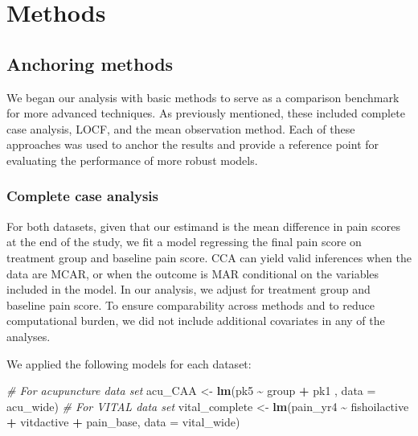 \documentclass{article}
\newenvironment{Shaded}{\begin{snugshade}}{\end{snugshade}}
\newcommand{\AttributeTok}[1]{\textcolor[rgb]{0.13,0.29,0.53}{#1}}
\newcommand{\CommentTok}[1]{\textcolor[rgb]{0.56,0.35,0.01}{\textit{#1}}}
\newcommand{\FunctionTok}[1]{\textcolor[rgb]{0.13,0.29,0.53}{\textbf{#1}}}
\newcommand{\NormalTok}[1]{#1}
\newcommand{\OtherTok}[1]{\textcolor[rgb]{0.56,0.35,0.01}{#1}}
\newcommand{\SpecialCharTok}[1]{\textcolor[rgb]{0.81,0.36,0.00}{\textbf{#1}}}
\begin{document}
\newpage

\section{Methods}\label{methods}

\subsection{Anchoring methods}\label{anchoring-methods}

We began our analysis with basic methods to serve as a comparison
benchmark for more advanced techniques. As previously mentioned, these
included complete case analysis, LOCF, and the mean observation method.
Each of these approaches was used to anchor the results and provide a
reference point for evaluating the performance of more robust models.

\subsubsection{Complete case analysis}\label{complete-case-analysis}

For both datasets, given that our estimand is the mean difference in
pain scores at the end of the study, we fit a model regressing the final
pain score on treatment group and baseline pain score. CCA can yield
valid inferences when the data are MCAR, or when the outcome is MAR
conditional on the variables included in the model. In our analysis, we
adjust for treatment group and baseline pain score. To ensure
comparability across methods and to reduce computational burden, we did
not include additional covariates in any of the analyses.

We applied the following models for each dataset:

\begin{Shaded}
\begin{Highlighting}[]
\CommentTok{\# For acupuncture data set}
\NormalTok{acu\_CAA }\OtherTok{\textless{}{-}} \FunctionTok{lm}\NormalTok{(pk5 }\SpecialCharTok{\textasciitilde{}}\NormalTok{ group }\SpecialCharTok{+}\NormalTok{ pk1 , }\AttributeTok{data =}\NormalTok{ acu\_wide)}
\CommentTok{\# For VITAL data set}
\NormalTok{vital\_complete }\OtherTok{\textless{}{-}} \FunctionTok{lm}\NormalTok{(pain\_yr4 }\SpecialCharTok{\textasciitilde{}}\NormalTok{ fishoilactive }\SpecialCharTok{+}\NormalTok{ vitdactive }\SpecialCharTok{+}\NormalTok{ pain\_base, }\AttributeTok{data =}\NormalTok{ vital\_wide)}
\end{Highlighting}
\end{Shaded}
\end{document}
